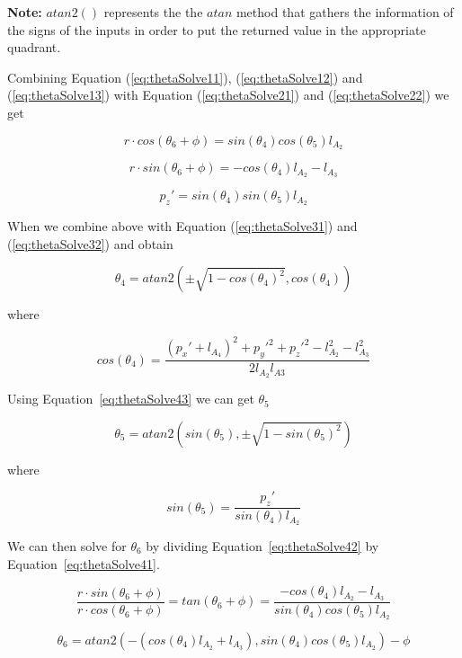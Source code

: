 \textbf{Note:} $atan2()$ represents the the $atan$ method that gathers the information of the signs of the inputs in order to put the returned value in the appropriate quadrant.

Combining Equation (\ref{eq:thetaSolve11}), (\ref{eq:thetaSolve12}) and (\ref{eq:thetaSolve13}) with Equation (\ref{eq:thetaSolve21}) and (\ref{eq:thetaSolve22}) we get

\begin{equation}\label{eq:thetaSolve41}
r \cdot cos(\theta_6+\phi) = sin(\theta_4)cos(\theta_5)l_{A_2}
\end{equation}

\begin{equation}\label{eq:thetaSolve42}
r \cdot sin(\theta_6+\phi) = -cos(\theta_4)l_{A_2}-l_{A_3}
\end{equation}

\begin{equation}\label{eq:thetaSolve43}
p_z' = sin(\theta_4)sin(\theta_5)l_{A_2}
\end{equation}


When we combine above with Equation (\ref{eq:thetaSolve31}) and (\ref{eq:thetaSolve32}) and obtain 


\begin{equation}
\theta_4 = atan2\left( \pm \sqrt{1-cos(\theta_4)^2} , cos(\theta_4)  \right)
\end{equation}

where

\begin{equation}
cos(\theta_4) = \frac{(p_x'+l_{A_4})^2  +  p_y'^2  +  p_z'^2  -  l_{A_2}^2  -  l_{A_3}^2}
                     {2l_{A_2}l_{A3}}
\end{equation}

Using Equation~\ref{eq:thetaSolve43} we can get $\theta_5$

\begin{equation}
\theta_5 = atan2(sin(\theta_5), \pm\sqrt{1-sin(\theta_5)^2})
\end{equation}

where

\begin{equation}
sin(\theta_5) = \frac{p_z'}
                     {sin(\theta_4)l_{A_2}}
\end{equation}


We can then solve for $\theta_6$ by dividing Equation~\ref{eq:thetaSolve42} by Equation~\ref{eq:thetaSolve41}.



\begin{equation}
\frac{r \cdot sin(\theta_6+\phi)}
     {r \cdot cos(\theta_6+\phi)} = tan(\theta_6+\phi) = \frac{-cos(\theta_4)l_{A_2}-l_{A_3}}
                                                              {sin(\theta_4)cos(\theta_5)l_{A_2}}
\end{equation}

\begin{equation}
\theta_6 = atan2(-(cos(\theta_4)l_{A_2}+l_{A_3}), sin(\theta_4)cos(\theta_5)l_{A_2}) - \phi
\end{equation}


